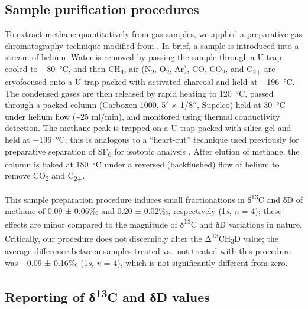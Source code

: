 



\subsection{Sample purification procedures
}\label{sample-purification-procedures}




To extract methane quantitatively from gas samples, we applied a
preparative-gas chromatography technique modified from \textcite{Alei++_1987_AtmE}. In brief, a sample is introduced into a stream of helium.
Water is removed by passing the sample through a U-trap cooled to $-$80~°C, and then CH\textsubscript{4}, air (N\textsubscript{2},
O\textsubscript{2}, Ar), CO, CO\textsubscript{2}, and
C\textsubscript{2+} are cryofocused onto a U-trap packed with activated
charcoal and held at $-$196~°C. The condensed gases are then released by
rapid heating to 120~°C, passed through a packed column (Carboxen-1000,
5$'$ × 1/8$''$, Supelco) held at 30~°C under helium flow (\textasciitilde{}25
ml/min), and monitored using thermal conductivity detection. The methane
peak is trapped on a U-trap packed with silica gel and held at $-$196~°C;
this is analogous to a ``heart-cut'' technique used previously for
preparative separation of SF\textsubscript{6} for isotopic analysis
\parencite{Ono++_2006_CG}. After elution of methane, the column is baked at 180~°C
under a reversed (backflushed) flow of helium to remove
CO\textsubscript{2} and C\textsubscript{2+}.

This sample preparation procedure induces small fractionations in
δ\textsuperscript{13}C and δD of methane of 0.09 ± 0.06‰ and 0.20 ±
0.02‰, respectively (1\emph{s}, \emph{n} = 4); these effects are minor
compared to the magnitude of δ\textsuperscript{13}C and δD variations in
nature. Critically, our procedure does not discernibly alter the
Δ\textsuperscript{13}CH\textsubscript{3}D value; the average difference
between samples treated vs.\ not treated with this procedure was $-$0.09 ±
0.16‰ (1\emph{s}, \emph{n} = 4), which is not significantly different
from zero.

\subsection{\texorpdfstring{Reporting of δ\textsuperscript{13}C and δD
		values}{Reporting of δ13C and δD
		values}}\label{reporting-of-ux3b413c-and-ux3b4d-values}

